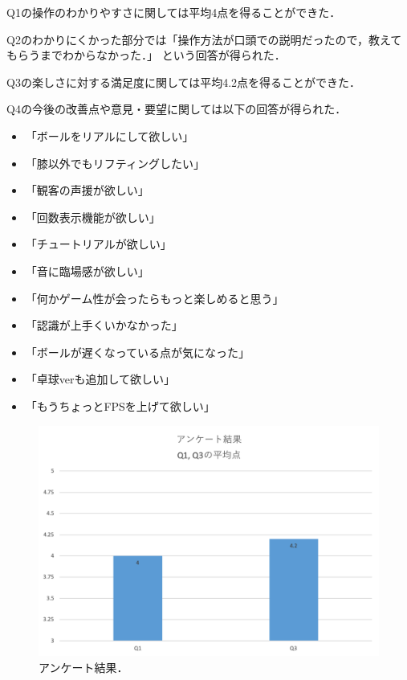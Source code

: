 Q1の操作のわかりやすさに関しては平均4点を得ることができた．

Q2のわかりにくかった部分では「操作方法が口頭での説明だったので，教えてもらうまでわからなかった．」
という回答が得られた．

Q3の楽しさに対する満足度に関しては平均4.2点を得ることができた．

Q4の今後の改善点や意見・要望に関しては以下の回答が得られた．
\begin{itemize}
  \item 「ボールをリアルにして欲しい」
  \item 「膝以外でもリフティングしたい」
  \item 「観客の声援が欲しい」
  \item 「回数表示機能が欲しい」
  \item 「チュートリアルが欲しい」
  \item 「音に臨場感が欲しい」
  \item 「何かゲーム性が会ったらもっと楽しめると思う」
  \item 「認識が上手くいかなかった」
  \item 「ボールが遅くなっている点が気になった」
  \item 「卓球verも追加して欲しい」
  \item 「もうちょっとFPSを上げて欲しい」
\end{itemize}


\begin{figure}[p]
  \centering
  \includegraphics[width=12cm]{image/ave.png}
  \caption[アンケート結果]{アンケート結果．}
\label{hyouka}
\end{figure}

